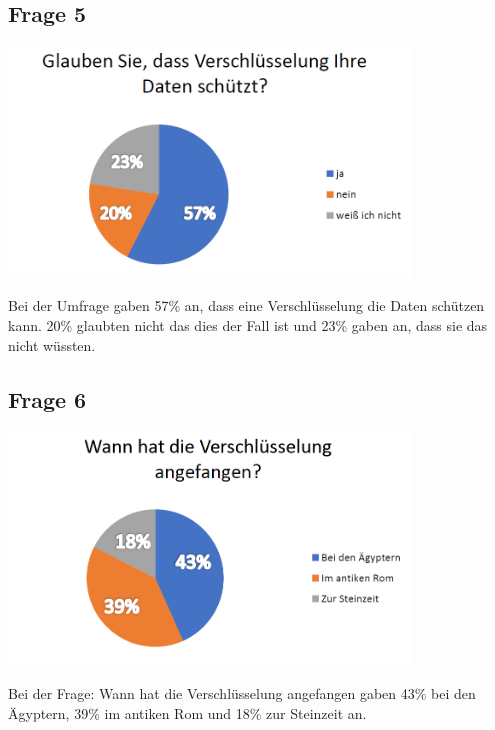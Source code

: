 \subsection{Frage 5}
\begin{center}
	\includegraphics[width=0.8\textwidth]{./img/umfrage5}
\end{center}
Bei der Umfrage gaben 57\% an, dass eine Verschlüsselung die Daten schützen kann. 20\% glaubten nicht das dies der Fall ist und 23\% gaben an, dass sie das nicht wüssten.


\subsection{Frage 6}
\begin{center}
	\includegraphics[width=0.8\textwidth]{./img/umfrage6}
\end{center}
Bei der Frage: Wann hat die Verschlüsselung angefangen gaben 43\% bei den Ägyptern, 39\% im antiken Rom und 18\% zur Steinzeit an.


